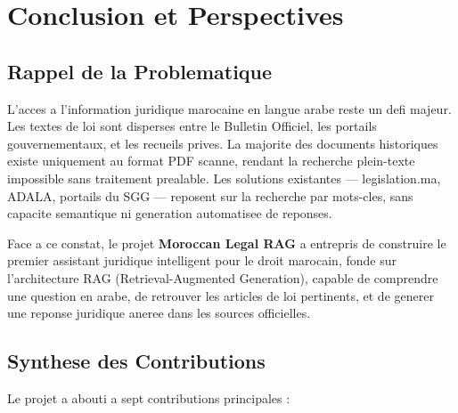 \chapter{Conclusion et Perspectives}

\section{Rappel de la Problematique}

L'acces a l'information juridique marocaine en langue arabe reste un defi majeur. Les textes de loi sont disperses entre le Bulletin Officiel, les portails gouvernementaux, et les recueils prives. La majorite des documents historiques existe uniquement au format PDF scanne, rendant la recherche plein-texte impossible sans traitement prealable. Les solutions existantes --- legislation.ma, ADALA, portails du SGG --- reposent sur la recherche par mots-cles, sans capacite semantique ni generation automatisee de reponses.

Face a ce constat, le projet \textbf{Moroccan Legal RAG} a entrepris de construire le premier assistant juridique intelligent pour le droit marocain, fonde sur l'architecture RAG (Retrieval-Augmented Generation), capable de comprendre une question en arabe, de retrouver les articles de loi pertinents, et de generer une reponse juridique aneree dans les sources officielles.

\section{Synthese des Contributions}

Le projet a abouti a sept contributions principales :

